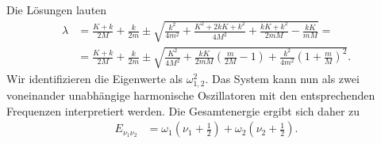 \documentclass[english, parskip=full]{scrartcl}
\newcommand{\kla}{}
\begin{document}
Die Lösungen lauten 
\begin{align}
\lambda &= \frac{K+k}{2M} + \frac{k}{2m} \pm \sqrt{\frac{k^2}{4m^2} + \frac{K^2 + 2kK + k^2}{4M^2} + \frac{kK+k^2}{2mM} - \frac{kK}{mM}} = \\
&= \frac{K+k}{2M} + \frac{k}{2m} \pm \sqrt{\frac{K^2}{4M^2} + \frac{kK}{2mM} \kla\left( \frac{m}{2M} - 1 \right) + \frac{k^2}{4m^2} \kla\left( 1 + \frac{m}{M} \right)^2}.
\end{align}
Wir identifizieren die Eigenwerte als $\omega_{1,2}^2$.
Das System kann nun als zwei voneinander unabhängige harmonische Oszillatoren mit den entsprechenden Frequenzen interpretiert werden.
Die Gesamtenergie ergibt sich daher zu
\begin{align}
E_{\nu_1\nu_2} &= \omega_1 \kla\left( \nu_1 + \frac{1}{2} \right) + \omega_2 \kla\left( \nu_2 + \frac{1}{2} \right).
\end{align}
\end{document}
